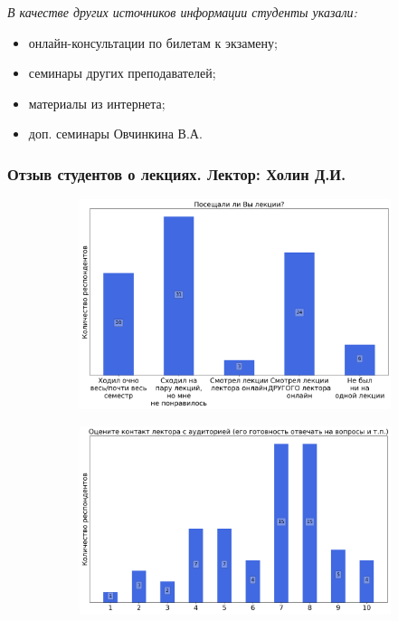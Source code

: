 		\textit{В качестве других источников информации студенты указали:} 
		\begin{itemize}
			\item онлайн-консультации по билетам к экзамену;
			\item семинары других преподавателей;
			\item материалы из интернета;
			\item доп. семинары Овчинкина В.А.
		\end{itemize}

	\subsubsection{Отзыв студентов о лекциях. Лектор: Холин Д.И.}

		\begin{figure}[H]
			\centering
            \begin{subfigure}[b]{0.45\textwidth}
				\centering
				\includegraphics[width=\textwidth]{images/1 course/Общая физика - механика/lecturer-questions-Холин Д.И.-0.png}
			\end{subfigure}
			\begin{subfigure}[b]{0.45\textwidth}
				\centering
				\includegraphics[width=\textwidth]{images/1 course/Общая физика - механика/lecturer-marks-Холин Д.И.-0.png}

\end{subfigure}
\end{figure}
